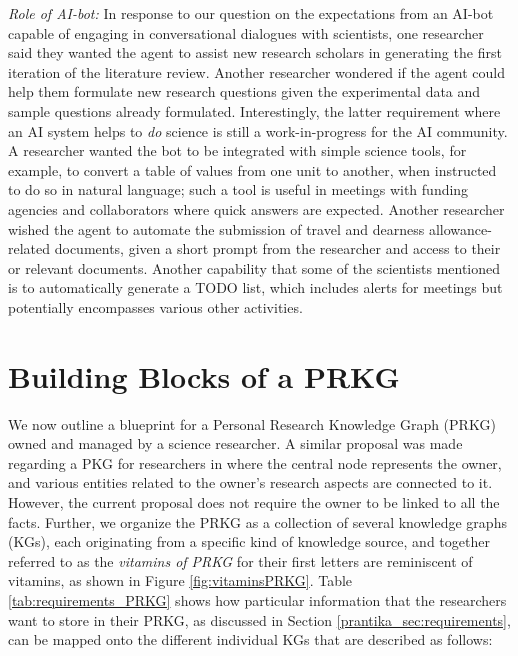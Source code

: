 \documentclass[11pt,pdftex]{article}
\begin{document}
\textit{Role of AI-bot: }In response to our question on the expectations from an AI-bot capable of engaging in conversational dialogues with scientists, one researcher said they wanted the agent to assist new research scholars in generating the first iteration of the literature review. Another researcher wondered if the agent could help them formulate new research questions given the experimental data and sample questions already formulated. Interestingly, the latter requirement where an AI system helps to \textit{do} science is still a work-in-progress for the AI community. A researcher wanted the bot to be integrated with simple science tools, for example, to convert a table of values from one unit to another, when instructed to do so in natural language; such a tool is useful in meetings with funding agencies and collaborators where quick answers are expected. Another researcher wished the agent to automate the submission of travel and dearness allowance-related documents, given a short prompt from the researcher and access to their or relevant documents. Another capability that some of the scientists mentioned is to automatically generate a TODO list, which includes alerts for meetings but potentially encompasses various other activities. 

\section{Building Blocks of a PRKG} 
\label{prantika_sec:prkg}
We now outline a blueprint for a Personal Research Knowledge Graph (PRKG) owned and managed by a science researcher. A similar proposal was made regarding a PKG for researchers in \cite{chakraborty2022} where the central node represents the owner, and various entities related to the owner's research aspects are connected to it. 
However, the current proposal does not require the owner to be linked to all the facts. Further, we organize the PRKG as a collection of several knowledge graphs (KGs), each originating from a specific kind of knowledge source, and together referred to as the \textit{vitamins of PRKG} for their first letters are reminiscent of vitamins, as shown in Figure \ref{fig:vitaminsPRKG}. Table \ref{tab:requirements_PRKG} shows how particular information that the researchers want to store in their PRKG, as discussed in Section \ref{prantika_sec:requirements}, can be mapped onto the different individual KGs that are described as follows:
\end{document}
